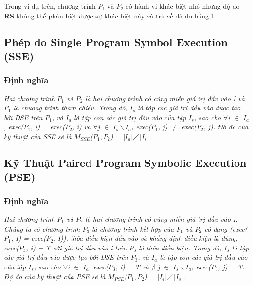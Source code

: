 	Trong ví dụ trên, chương trình $P_{1}$ và $P_{2}$ có hành vi khác biệt nhỏ nhưng độ đo \textbf{RS} không thể phân biệt được sự khác biệt này và trả về độ đo bằng 1.
	
	
\subsection{Phép đo Single Program Symbol Execution (SSE)}
	\subsubsection{Định nghĩa}
	\textit{Hai chương trình $P_{1}$ và $P_{2}$ là hai chương trình có cùng miền giá trị đầu vào I và $P_{1}$ là chương trình tham chiếu. Trong đó, $I_{s}$ là tập các giá trị đầu vào được tạo bởi DSE trên $P_{1}$, và  $I_{a}$ là tập con các giá trị đầu vào của tập $I_{s}$, sao cho $\forall$i $\in$ $I_{a}$, exec($P_{1}$, i) = exec($P_{2}$, i) và $\forall$j $\in$ $I_{s} \backslash I_{a}$, exec($P_{1}$, j) $\neq$ exec($P_{2}$, j). Độ đo của kỹ thuật của SSE sẽ là $M_{SSE}$($P_{1},P_{2}$) = $\left|I_{a}\right|$$\diagup$$\left|I_{s}\right|$.}

\subsection{Kỹ Thuật Paired Program Symbolic Execution (PSE)}
\subsubsection{Định nghĩa}
	
\textit{Hai chương trình $P_{1}$ và $P_{2}$ là hai chương trình có cùng miền giá trị đầu vào I. Chúng ta có chương trình $P_{3}$ là chương trình kết hợp của $P_{1}$ và $P_{2}$ có dạng (exec($P_{1}$, I) = exec($P_{2}$, I)), thõa điều kiện đầu vào và khẳng định điều kiện là đúng, exec($P_{3}$, i) = T với giá trị đầu vào i trên $P_{3}$ là thõa điều kiện. Trong đó, $I_{s}$ là tập các giá trị đầu vào được tạo bởi DSE trên $P_{3}$, và  $I_{a}$ là tập con các giá trị đầu vào của tập $I_{s}$, sao cho $\forall$i $\in$ $I_{a}$, exec($P_{3}$, i) = T và $\nexists $ j $\in$ $I_{s} \backslash I_{a}$, exec($P_{3}$, j) = T. Độ đo của kỹ thuật của PSE sẽ là $M_{PSE}$($P_{1},P_{2}$) = $\left|I_{a}\right|$$\diagup$$\left|I_{s}\right|$.}
	